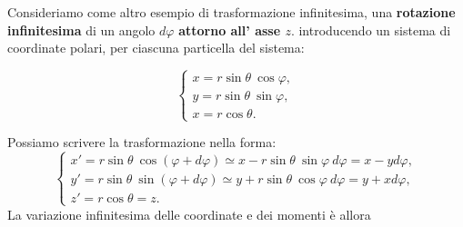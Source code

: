 Consideriamo come altro esempio di trasformazione infinitesima, una \textbf{rotazione infinitesima} di un angolo $d\varphi$ \textbf{attorno all' asse $z$}. introducendo un sistema di coordinate polari, per ciascuna particella del sistema:
\begin{center}
\begin{minipage}{0.50\textwidth}
\centering
{}
%
%
\end{minipage}
\begin{minipage}[c]{0.4\textwidth}
\centering
\begin{equation}
\begin{cases} 
x= r \sin \theta \ \cos \varphi , \\
y= r \sin \theta \ \sin \varphi  ,\\
x= r \cos \theta .
\end{cases}
\end{equation}
\end{minipage}
\end{center}
Possiamo scrivere la trasformazione nella forma:
	\begin{equation}
		\begin{cases}
			x'= r \sin \theta \ \cos (\varphi + d \varphi ) \simeq x- r \sin \theta \ \sin \varphi \ d \varphi = x-yd\varphi ,\\
			y'= r \sin \theta \ \sin (\varphi + d \varphi ) \simeq y+ r \sin \theta \ \cos \varphi \ d \varphi = y+xd\varphi ,\\
			z' = r\cos \theta = z .
		\end{cases}
	\end{equation}
La variazione infinitesima delle coordinate e dei momenti è allora
